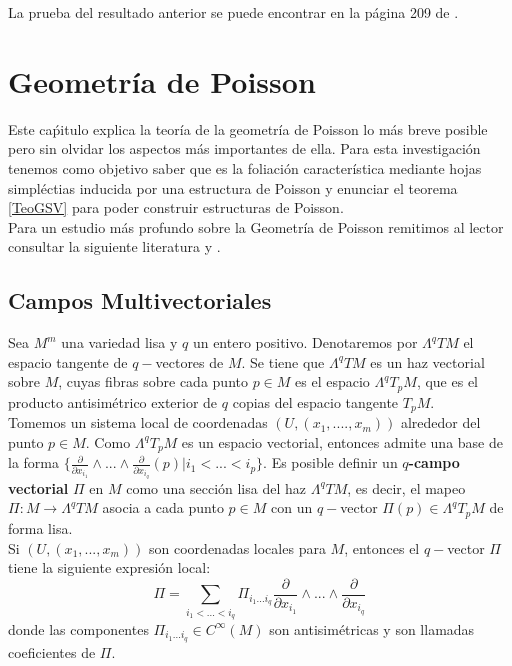 \documentclass[a4paper,10pt]{book}
\begin{document}
La prueba del resultado anterior se puede encontrar en la p\'agina 209 de \cite{Seade1}. 

\chapter{Geometr\'ia de Poisson}\label{cap2}%

Este ca\'pitulo explica la teor\'ia de la geometr\'ia de Poisson lo m\'as breve posible pero sin olvidar los aspectos m\'as importantes de ella. Para esta investigaci\'on tenemos como objetivo saber que es la foliaci\'on caracter\'istica mediante hojas simpl\'ectias inducida por una estructura de Poisson y enunciar el teorema \ref{TeoGSV} para poder construir estructuras de Poisson.\\

Para un estudio  m\'as profundo sobre la Geometr\'ia de Poisson remitimos al lector consultar la siguiente literatura \cite{Dufour} y \cite{Laurent}.

\section{Campos Multivectoriales}\label{2.1}

Sea $M^{m}$ una variedad lisa y $q$ un entero positivo. Denotaremos por $\Lambda^{q}TM$ el espacio tangente de $q-$vectores de $M$. Se tiene que $\Lambda^{q}TM$ es un haz vectorial sobre $M$, cuyas fibras sobre cada punto $p\in M$ es el espacio $\Lambda^{q}T_{p}M$, que es el producto antisim\'etrico exterior de $q$ copias del espacio tangente $T_{p}M$. \\

Tomemos un sistema local de coordenadas $(U,(x_{1},....,x_{m}))$ alrededor del punto $p\in M$. Como $\Lambda^{q}T_{p}M$ es un espacio vectorial, entonces admite una base de la forma $\{\frac{\partial}{\partial x_{i_{1}}}\wedge...\wedge\frac{\partial}{\partial x_{i_{q}}}(p) | i_{1}<...<i_{p}\}$. Es posible definir un {\bfseries $q$-campo vectorial} $\Pi$ en $M$ como una secci\'on lisa del haz $\Lambda^{q}TM$, es decir, el mapeo $\Pi:M\to\Lambda^{q}TM$ asocia a cada punto $p\in M$ con un $q-$vector $\Pi(p)\in\Lambda^{q}T_{p}M$  de forma lisa.\\

Si $(U,(x_{1},...,x_{m}))$ son coordenadas locales para $M$, entonces el $q-$vector $\Pi$ tiene la siguiente expresi\'on local:
\begin{equation}\label{Ec2.1.1}
\Pi = \sum\limits_{i_{1}<...<i_{q}}\Pi_{i_{1}...i_{q}}\frac{\partial}{\partial x_{i_{1}}}\wedge...\wedge\frac{\partial}{\partial x_{i_{q}}}
\end{equation}
donde las componentes $\Pi_{i_{1}...i_{q}}\in C^{\infty}(M)$ son antisim\'etricas y son llamadas coeficientes de $\Pi$.\\
\end{document}
